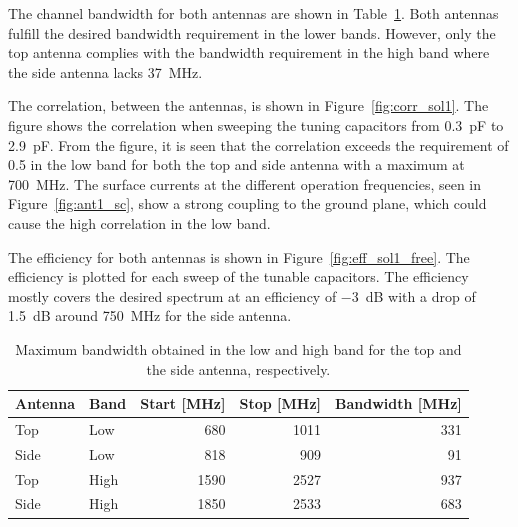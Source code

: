 The channel bandwidth for both antennas are shown in Table~\ref{tab:bw_sol1}. Both antennas fulfill the desired bandwidth requirement in the lower bands. However, only the top antenna complies with the bandwidth requirement in the high band where the side antenna lacks \SI{37}{MHz}.

The correlation, between the antennas, is shown in Figure~\ref{fig:corr_sol1}. The figure shows the correlation when sweeping the tuning capacitors from \SI{0.3}{pF} to \SI{2.9}{pF}. From the figure, it is seen that the correlation exceeds the requirement of \num{0.5} in the low band for both the top and side antenna with a maximum at \SI{700}{MHz}. The surface currents at the different operation frequencies, seen in Figure~\ref{fig:ant1_sc}, show a strong coupling to the ground plane, which could cause the high correlation in the low band.

The efficiency for both antennas is shown in Figure~\ref{fig:eff_sol1_free}. The efficiency is plotted for each sweep of the tunable capacitors. The efficiency mostly covers the desired spectrum at an efficiency of \SI{-3}{dB} with a drop of \SI{1.5}{dB} around \SI{750}{MHz} for the side antenna. 

    \begin{table}
        \centering
        \begin{tabular}{|l|l|r|r|r|}
            \hline
            Antenna & Band & Start [MHz] & Stop [MHz] & Bandwidth [MHz] \\
            \hline
            Top     & Low  & 680         & 1011       & 331 \\
            Side    & Low  & 818         & 909        & 91 \\
            \hline
            Top     & High & 1590        & 2527       & 937 \\
            Side    & High & 1850        & 2533       & 683 \\
            \hline
        \end{tabular}
        \caption{Maximum bandwidth obtained in the low and high band for the top and the side antenna, respectively.}
        \label{tab:bw_sol1}
    \end{table}

